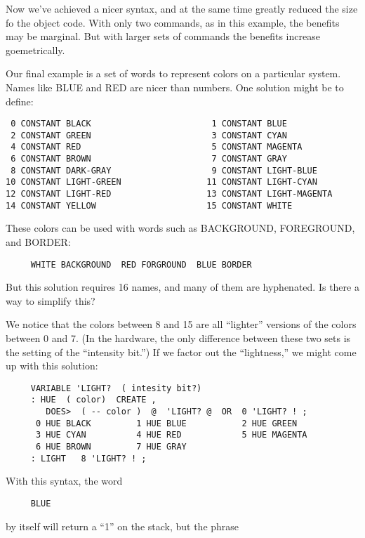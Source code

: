 \noindent
Now we've achieved a nicer syntax, and at the same time greatly reduced the size fo the object code. With only two commands, as in this example, the benefits may be marginal. But with larger sets of commands the benefits increase goemetrically.

Our final example is a set of words to represent colors on a particular system. Names like BLUE and RED are nicer than numbers. One solution might be to define:

\begin{verbatim}
 0 CONSTANT BLACK                        1 CONSTANT BLUE
 2 CONSTANT GREEN                        3 CONSTANT CYAN
 4 CONSTANT RED                          5 CONSTANT MAGENTA
 6 CONSTANT BROWN                        7 CONSTANT GRAY
 8 CONSTANT DARK-GRAY                    9 CONSTANT LIGHT-BLUE
10 CONSTANT LIGHT-GREEN                 11 CONSTANT LIGHT-CYAN
12 CONSTANT LIGHT-RED                   13 CONSTANT LIGHT-MAGENTA
14 CONSTANT YELLOW                      15 CONSTANT WHITE
\end{verbatim}
These colors can be used with words such as BACKGROUND, FOREGROUND, and BORDER:

\begin{verbatim}
     WHITE BACKGROUND  RED FORGROUND  BLUE BORDER
\end{verbatim}
But this solution requires 16 names, and many of them are hyphenated. Is there a way to simplify this?

We notice that the colors between 8 and 15 are all ``lighter'' versions of the colors between 0 and 7. (In the hardware, the only difference between these two sets is the setting of the ``intensity bit.'') If we factor out the ``lightness,'' we might come up with this solution:

\begin{verbatim}
     VARIABLE 'LIGHT?  ( intesity bit?)
     : HUE  ( color)  CREATE ,
        DOES>  ( -- color )  @  'LIGHT? @  OR  0 'LIGHT? ! ;
      0 HUE BLACK         1 HUE BLUE           2 HUE GREEN
      3 HUE CYAN          4 HUE RED            5 HUE MAGENTA
      6 HUE BROWN         7 HUE GRAY
     : LIGHT   8 'LIGHT? ! ;
\end{verbatim}
     
\noindent     
With this syntax, the word

\begin{verbatim}
     BLUE
\end{verbatim}
by itself will return a ``1'' on the stack, but the phrase

